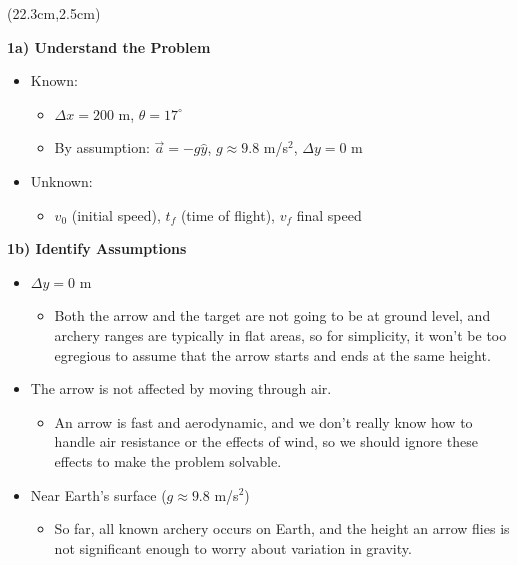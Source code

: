 \documentclass[]{article}
\begin{document}
\begin{textblock*}{5cm}(22.3cm,2.5cm)
	\Large
\end{textblock*}
\newpage
\begin{TeacherMargin}
\noindent\textbf{1a) Understand the Problem}
\begin{itemize}
	\item Known:
	\begin{itemize}
		\item $\Delta x = 200$ m, $\theta = 17^{\circ}$
		\item By assumption: $\vec{a}=-g\hat{y}$, $g\approx9.8$ m/s$^{2}$, $\Delta y = 0$ m
	\end{itemize}
	\item Unknown:
	\begin{itemize}
		\item $v_{0}$ (initial speed), $t_{f}$ (time of flight), $v_{f}$ final speed
	\end{itemize}
\end{itemize}
\noindent\textbf{1b) Identify Assumptions}
\begin{itemize}
	\item $\Delta y = 0$ m
	\begin{itemize}
		\item Both the arrow and the target are not going to be at ground level, and archery ranges are typically in flat areas, so for simplicity, it won't be too egregious to assume that the arrow starts and ends at the same height.
	\end{itemize}
	\item The arrow is not affected by moving through air.
	\begin{itemize}
		\item An arrow is fast and aerodynamic, and we don't really know how to handle air resistance or the effects of wind, so we should ignore these effects to make the problem solvable.
	\end{itemize}
	\item Near Earth's surface ($g\approx9.8$ m/s$^{2}$)
	\begin{itemize}
		\item So far, all known archery occurs on Earth, and the height an arrow flies is not significant enough to worry about variation in gravity.

\end{itemize}
\end{itemize}
\end{TeacherMargin}
\end{document}
